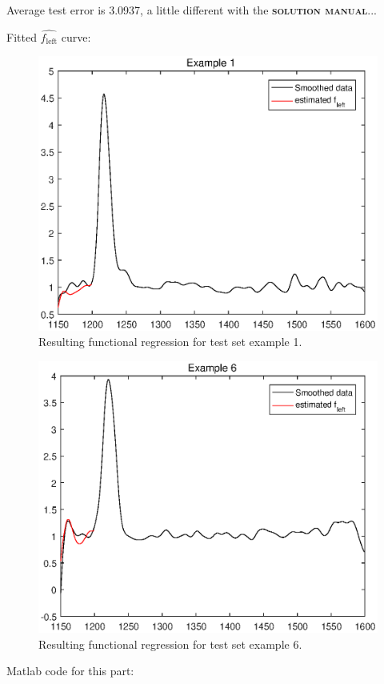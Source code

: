 \documentclass[11pt]{article}
\begin{document}
\begin{enumerate}[i.]
Average test error is 3.0937, a little different with the \textsc{\textbf{solution manual}}...

Fitted $\widehat{f_\text{left}}$ curve:
\begin{figure}[htb]
  \centering
  \includegraphics{ps1q5pciiiex1}
  \caption{Resulting functional regression for test set example 1.}\label{ps1q5pciiiex1}
\end{figure}
\begin{figure}[htb]
  \centering
  \includegraphics{ps1q5pciiiex6}
  \caption{Resulting functional regression for test set example 6.}\label{ps1q5pciiiex6}
\end{figure}

Matlab code for this part:




      
      
\end{enumerate}
\end{document}

